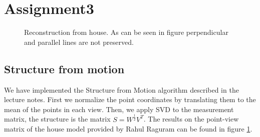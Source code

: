\documentclass[12pt]{amsart}
\begin{document}
\section{Assignment3}
\begin{figure}[H]
\center
{}
\center
{}
\caption{Reconstruction from house. As can be seen in figure  perpendicular and parallel lines are not preserved.}
\label{rec}
\end{figure}


\subsection{Structure from motion}
We have implemented the Structure from Motion algorithm described in the lecture notes. First we normalize the point coordinates by translating them to the mean of the points in each view. Then, we apply SVD to the measurement matrix, the structure is the matrix $S = W^{\frac{1}{2}} V^T$. The results on the point-view matrix of the house model provided by Rahul Raguram can be found in figure \ref{rec}.
\end{document}

